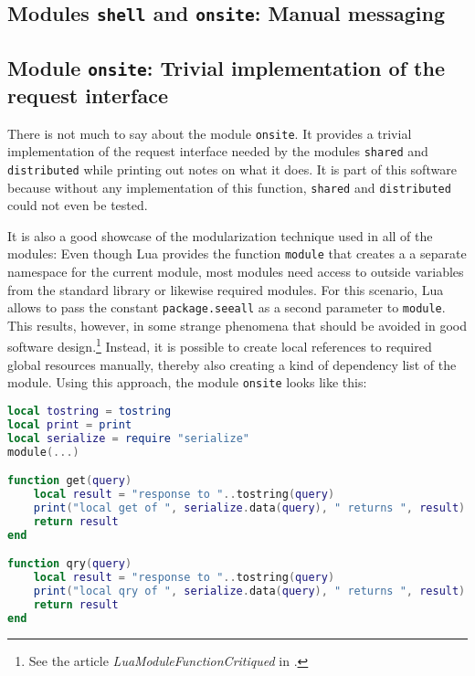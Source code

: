 \begin{appendices}

\chapter{Modules \texttt{shell} and \texttt{onsite}: Manual messaging}
\label{shell}

\section{Module \texttt{onsite}: Trivial implementation of the request interface}

There is not much to say about the module \texttt{onsite}. It provides a trivial implementation of the request interface needed by the modules \texttt{shared} and \texttt{distributed} while printing out notes on what it does. It is part of this software because without any implementation of this function, \texttt{shared} and \texttt{distributed} could not even be tested.

It is also a good showcase of the modularization technique used in all of the modules: Even though Lua provides the function \texttt{module} that creates a a separate namespace for the current module, most modules need access to outside variables from the standard library or likewise required modules. For this scenario, Lua allows to pass the constant \texttt{package.seeall} as a second parameter to \texttt{module}. This results, however, in some strange phenomena that should be avoided in good software design.\footnote{See the article \emph{LuaModuleFunctionCritiqued} in \cite{LuaUsersWiki}.} Instead, it is possible to create local references to required global resources manually, thereby also creating a kind of dependency list of the module. Using this approach, the module \texttt{onsite} looks like this:

\begin{lstlisting}[language=lua, caption={The module \texttt{onsite}}, label=lst:onsite, name=lst:onsite]
local tostring = tostring
local print = print
local serialize = require "serialize"
module(...)

function get(query)
	local result = "response to "..tostring(query)
	print("local get of ", serialize.data(query), " returns ", result)
	return result
end

function qry(query)
	local result = "response to "..tostring(query)
	print("local qry of ", serialize.data(query), " returns ", result)
	return result
end


\end{lstlisting}
\end{appendices}
